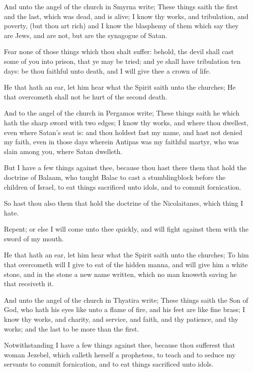 \verse And unto the angel of the church in Smyrna write; These things saith the first and the last, which was dead, and is alive; \verse I know thy works, and tribulation, and poverty, (but thou art rich) and I know the blasphemy of them which say they are Jews, and are not, but are the synagogue of Satan.

\verse Fear none of those things which thou shalt suffer: behold, the devil shall cast some of you into prison, that ye may be tried; and ye shall have tribulation ten days: be thou faithful unto death, and I will give thee a crown of life.

\verse He that hath an ear, let him hear what the Spirit saith unto the churches; He that overcometh shall not be hurt of the second death.

\verse And to the angel of the church in Pergamos write; These things saith he which hath the sharp sword with two edges; \verse I know thy works, and where thou dwellest, even where Satan's seat is: and thou holdest fast my name, and hast not denied my faith, even in those days wherein Antipas was my faithful martyr, who was slain among you, where Satan dwelleth.

\verse But I have a few things against thee, because thou hast there them that hold the doctrine of Balaam, who taught Balac to cast a stumblingblock before the children of Israel, to eat things sacrificed unto idols, and to commit fornication.

\verse So hast thou also them that hold the doctrine of the Nicolaitanes, which thing I hate.

\verse Repent; or else I will come unto thee quickly, and will fight against them with the sword of my mouth.

\verse He that hath an ear, let him hear what the Spirit saith unto the churches; To him that overcometh will I give to eat of the hidden manna, and will give him a white stone, and in the stone a new name written, which no man knoweth saving he that receiveth it.

\verse And unto the angel of the church in Thyatira write; These things saith the Son of God, who hath his eyes like unto a flame of fire, and his feet are like fine brass; \verse I know thy works, and charity, and service, and faith, and thy patience, and thy works; and the last to be more than the first.

\verse Notwithstanding I have a few things against thee, because thou sufferest that woman Jezebel, which calleth herself a prophetess, to teach and to seduce my servants to commit fornication, and to eat things sacrificed unto idols.

